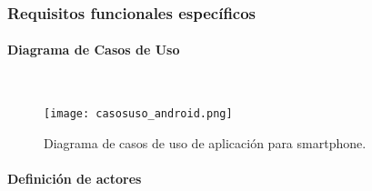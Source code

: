             \begin{table}[H]
                \centering
                \caption{Objetivo 3 de la aplicación para smartphone: Gestionar alertas.}
               \label{android_obj3}
            \end{table}
        
            \subsubsection{Requisitos funcionales específicos}
            
                \paragraph{Diagrama de Casos de Uso}\mbox{}\\
                
                \begin{figure}[!ht]
                  \centering
                    \texttt{[image: casosuso\_android.png]}
                  \caption{Diagrama de casos de uso de aplicación para smartphone.}
                  \label{casosuso_android}
                \end{figure}
                
                \paragraph{Definición de actores}\mbox{}\\

                \begin{table}[!ht]
                    \centering
                    \caption{Actor 01: Usuario.}
                    \label{ACT01_android}
                \end{table}
                
